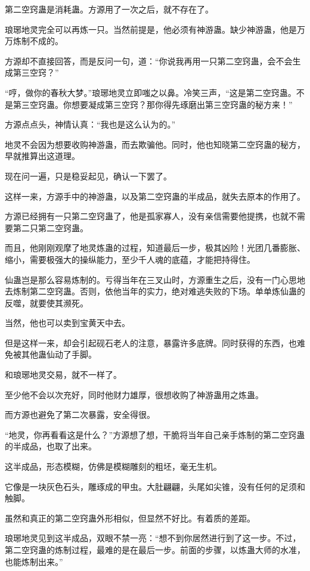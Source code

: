 \begin{this_body}
第二空窍蛊是消耗蛊。方源用了一次之后，就不存在了。

琅琊地灵完全可以再炼一只。当然前提是，他必须有神游蛊。缺少神游蛊，他是万万炼制不成的。

方源却不直接回答，而是反问一句，道：“你说我再用一只第二空窍蛊，会不会生成第三空窍？”

“哼，做你的春秋大梦。”琅琊地灵立即嗤之以鼻。冷笑三声，“这是第二空窍蛊。不是第三空窍蛊。你想要凝成第三空窍？那你得先琢磨出第三空窍蛊的秘方来！”

方源点点头，神情认真：“我也是这么认为的。”

地灵不会因为想要收购神游蛊，而去欺骗他。同时，他也知晓第二空窍蛊的秘方，早就推算出这道理。

现在问一遍，只是稳妥起见，确认一下罢了。

这样一来，方源手中的神游蛊，以及第二空窍蛊的半成品，就失去原本的作用了。

方源已经拥有一只第二空窍蛊了，他是孤家寡人，没有亲信需要他提携，也就不需要第二只第二空窍蛊。

而且，他刚刚观摩了地灵炼蛊的过程，知道最后一步，极其凶险！光团几番膨胀、缩小，需要极强大的操纵能力，至少千人魂的底蕴，才能把持得住。

仙蛊岂是那么容易炼制的。亏得当年在三叉山时，方源重生之后，没有一门心思地去炼制第二空窍蛊。否则，依他当年的实力，绝对难逃失败的下场。单单炼仙蛊的反噬，就要使其濒死。

当然，他也可以卖到宝黄天中去。

但是这样一来，却会引起砚石老人的注意，暴露许多底牌。同时获得的东西，也难免被其他蛊仙动了手脚。

和琅琊地灵交易，就不一样了。

至少他不会以次充好，同时他财力雄厚，很想收购了神游蛊用之炼蛊。

而方源也避免了第二次暴露，安全得很。

“地灵，你再看看这是什么？”方源想了想，干脆将当年自己亲手炼制的第二空窍蛊的半成品，也取了出来。

这半成品，形态模糊，仿佛是模糊雕刻的粗坯，毫无生机。

它像是一块灰色石头，雕琢成的甲虫。大肚翩翩，头尾如尖锥，没有任何的足须和触脚。

虽然和真正的第二空窍蛊外形相似，但显然不好比。有着质的差距。

琅琊地灵见到这半成品，双眼不禁一亮：“想不到你居然进行到了这一步。不过，第二空窍蛊的炼制过程，最难的是在最后一步。前面的步骤，以炼蛊大师的水准，也能炼制出来。”


\end{this_body}
